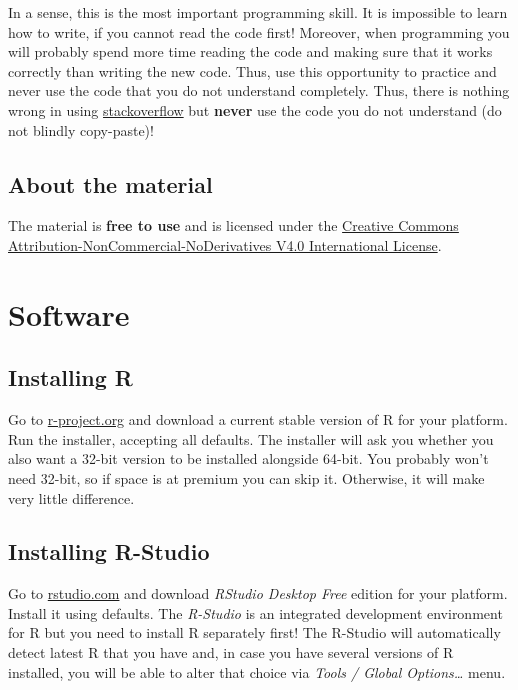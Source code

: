 \documentclass[
]{book}
\begin{document}
In a sense, this is the most important programming skill. It is impossible to learn how to write, if you cannot read the code first! Moreover, when programming you will probably spend more time reading the code and making sure that it works correctly than writing the new code. Thus, use this opportunity to practice and never use the code that you do not understand completely. Thus, there is nothing wrong in using \href{https://stackoverflow.com/}{stackoverflow} but \textbf{never} use the code you do not understand (do not blindly copy-paste)!

\hypertarget{about-the-material}{%
\section*{About the material}\label{about-the-material}}

The material is \textbf{free to use} and is licensed under the \href{https://creativecommons.org/licenses/by-nc-nd/4.0/}{Creative Commons Attribution-NonCommercial-NoDerivatives V4.0 International License}.

\hypertarget{software}{%
\chapter*{Software}\label{software}}

\hypertarget{install-r}{%
\section{Installing R}\label{install-r}}

Go to \href{https://cloud.r-project.org/}{r-project.org} and download a current stable version of R for your platform. Run the installer, accepting all defaults. The installer will ask you whether you also want a 32-bit version to be installed alongside 64-bit. You probably won't need 32-bit, so if space is at premium you can skip it. Otherwise, it will make very little difference.

\hypertarget{install-rstudio}{%
\section{Installing R-Studio}\label{install-rstudio}}

Go to \href{https://rstudio.com/products/rstudio/download/}{rstudio.com} and download \emph{RStudio Desktop Free} edition for your platform. Install it using defaults. The \emph{R-Studio} is an integrated development environment for R but you need to install R separately first! The R-Studio will automatically detect latest R that you have and, in case you have several versions of R installed, you will be able to alter that choice via \emph{Tools / Global Options\ldots{}} menu.
\end{document}
